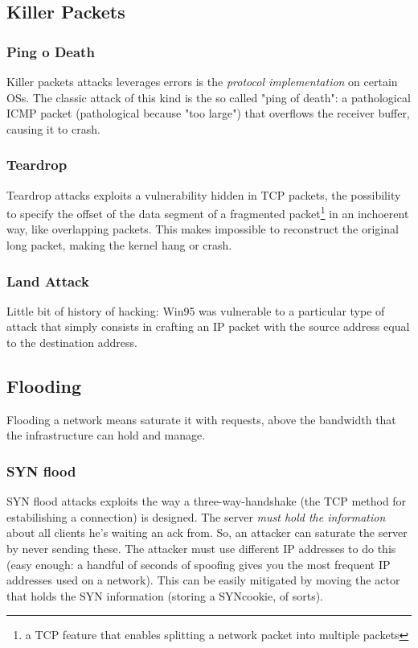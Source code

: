 \documentclass{article}
\begin{document}
			\subsection{Killer Packets}
				\subsubsection{Ping o Death}
					Killer packets attacks leverages errors is the \emph{protocol implementation} on certain OSs. The classic attack of this kind is the so called "ping of death": a pathological ICMP packet (pathological because "too large") that overflows the receiver buffer, causing it to crash. 
				
				\subsubsection{Teardrop}
					Teardrop attacks exploits a vulnerability hidden in TCP packets, the possibility to specify the offset of the data segment of a fragmented packet\footnote{a TCP feature that enables splitting a network packet into multiple packets} in an inchoerent way, like overlapping packets. This makes impossible to reconstruct the original long packet, making the kernel hang or crash. 
					
				\subsubsection{Land Attack}
					Little bit of history of hacking: Win95 was vulnerable to a particular type of attack that simply consists in crafting an IP packet with the source address equal to the destination address.
					
			\subsection{Flooding}
				Flooding a network means saturate it with requests, above the bandwidth that the infrastructure can hold and manage. 
				
				\subsubsection{SYN flood}
					SYN flood attacks exploits the way a three-way-handshake (the TCP method for estabilishing a connection) is designed. The server \emph{must hold the information} about all clients he's waiting an ack from. So, an attacker can saturate the server by never sending these. The attacker must use different IP addresses to do this (easy enough: a handful of seconds of spoofing gives you the most frequent IP addresses used on a network). This can be easily mitigated by moving the actor that holds the SYN information (storing a SYNcookie, of sorts).
					
\end{document}
